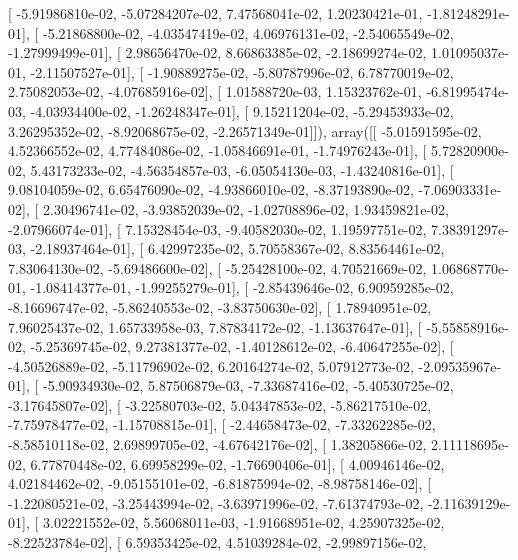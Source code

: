 \documentclass{article}
\begin{document}
       [ -5.91986810e-02,  -5.07284207e-02,   7.47568041e-02,
          1.20230421e-01,  -1.81248291e-01],
       [ -5.21868800e-02,  -4.03547419e-02,   4.06976131e-02,
         -2.54065549e-02,  -1.27999499e-01],
       [  2.98656470e-02,   8.66863385e-02,  -2.18699274e-02,
          1.01095037e-01,  -2.11507527e-01],
       [ -1.90889275e-02,  -5.80787996e-02,   6.78770019e-02,
          2.75082053e-02,  -4.07685916e-02],
       [  1.01588720e-03,   1.15323762e-01,  -6.81995474e-03,
         -4.03934400e-02,  -1.26248347e-01],
       [  9.15211204e-02,  -5.29453933e-02,   3.26295352e-02,
         -8.92068675e-02,  -2.26571349e-01]]), array([[ -5.01591595e-02,   4.52366552e-02,   4.77484086e-02,
         -1.05846691e-01,  -1.74976243e-01],
       [  5.72820900e-02,   5.43173233e-02,  -4.56354857e-03,
         -6.05054130e-03,  -1.43240816e-01],
       [  9.08104059e-02,   6.65476090e-02,  -4.93866010e-02,
         -8.37193890e-02,  -7.06903331e-02],
       [  2.30496741e-02,  -3.93852039e-02,  -1.02708896e-02,
          1.93459821e-02,  -2.07966074e-01],
       [  7.15328454e-03,  -9.40582030e-02,   1.19597751e-02,
          7.38391297e-03,  -2.18937464e-01],
       [  6.42997235e-02,   5.70558367e-02,   8.83564461e-02,
          7.83064130e-02,  -5.69486600e-02],
       [ -5.25428100e-02,   4.70521669e-02,   1.06868770e-01,
         -1.08414377e-01,  -1.99255279e-01],
       [ -2.85439646e-02,   6.90959285e-02,  -8.16696747e-02,
         -5.86240553e-02,  -3.83750630e-02],
       [  1.78940951e-02,   7.96025437e-02,   1.65733958e-03,
          7.87834172e-02,  -1.13637647e-01],
       [ -5.55858916e-02,  -5.25369745e-02,   9.27381377e-02,
         -1.40128612e-02,  -6.40647255e-02],
       [ -4.50526889e-02,  -5.11796902e-02,   6.20164274e-02,
          5.07912773e-02,  -2.09535967e-01],
       [ -5.90934930e-02,   5.87506879e-03,  -7.33687416e-02,
         -5.40530725e-02,  -3.17645807e-02],
       [ -3.22580703e-02,   5.04347853e-02,  -5.86217510e-02,
         -7.75978477e-02,  -1.15708815e-01],
       [ -2.44658473e-02,  -7.33262285e-02,  -8.58510118e-02,
          2.69899705e-02,  -4.67642176e-02],
       [  1.38205866e-02,   2.11118695e-02,   6.77870448e-02,
          6.69958299e-02,  -1.76690406e-01],
       [  4.00946146e-02,   4.02184462e-02,  -9.05155101e-02,
         -6.81875994e-02,  -8.98758146e-02],
       [ -1.22080521e-02,  -3.25443994e-02,  -3.63971996e-02,
         -7.61374793e-02,  -2.11639129e-01],
       [  3.02221552e-02,   5.56068011e-03,  -1.91668951e-02,
          4.25907325e-02,  -8.22523784e-02],
       [  6.59353425e-02,   4.51039284e-02,  -2.99897156e-02,
\end{document}
